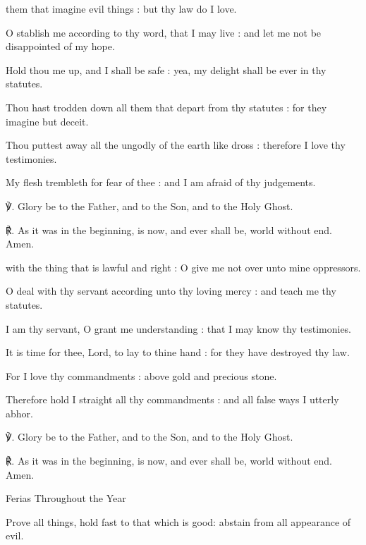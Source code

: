\begin{multicols}{2}
 them that imagine evil things : but thy law do I love.\par
{}
O stablish me according to thy word, that I may live : and let me not be disappointed of my hope.\par
{}Hold thou me up, and I shall be safe : yea, my delight shall be ever in thy statutes.\par
{}Thou hast trodden down all them that depart from thy statutes : for they imagine but deceit.\par
{}Thou puttest away all the ungodly of the earth like dross : therefore I love thy testimonies.\par
{}My flesh trembleth for fear of thee : and I am afraid of thy judgements.\par
℣. Glory be to the Father, and to the Son, and to the Holy Ghost.\par
℟. As it was in the beginning, is now, and ever shall be, world without end. Amen.

 with the thing that is lawful and right : O give me not over unto mine oppressors.\par
{}
O deal with thy servant according unto thy loving mercy : and teach me thy statutes.\par
{}I am thy servant, O grant me understanding : that I may know thy testimonies.\par
{}It is time for thee, Lord, to lay to thine hand : for they have destroyed thy law.\par
{}For I love thy commandments : above gold and precious stone.\par
{}Therefore hold I straight all thy commandments : and all false ways I utterly abhor.\par
℣. Glory be to the Father, and to the Son, and to the Holy Ghost.\par
℟. As it was in the beginning, is now, and ever shall be, world without end. Amen.

\begin{inhead}
	Ferias Throughout the Year
\end{inhead}\par\noindent
Prove all things, hold fast to that which is good: abstain from all appearance of evil.


\end{multicols}
